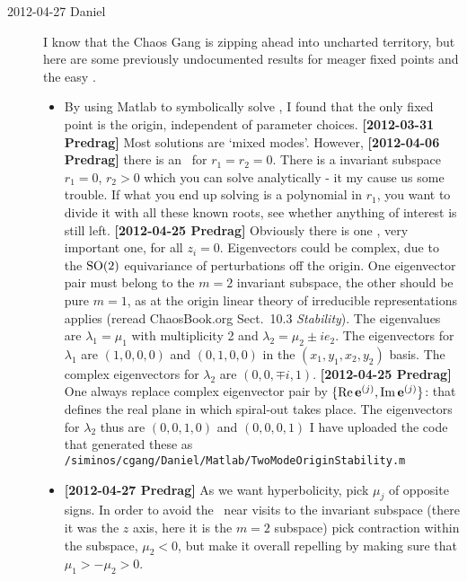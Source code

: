 \begin{description}
\item[2012-04-27 Daniel] I know that the Chaos Gang is zipping ahead into
uncharted territory, but here are some previously undocumented results
for meager fixed points and the easy \reqva.
	\begin{itemize}
		\item By using Matlab to symbolically solve  ,
             I found that the only fixed point is the origin, independent
             of parameter choices.
{\bf [2012-03-31 Predrag]} Most solutions are `mixed modes'. However,
{\bf [2012-04-06 Predrag]}
there is an \eqv\ for $r_1=r_2=0$. There is a invariant subspace $r_1=0$,
$r_2 > 0$ which you can solve analytically - it my cause us some trouble.
If what you end up solving is a polynomial in $r_1$, you want to divide
it with all these known roots, see whether anything of interest is still
left. {\bf [2012-04-25 Predrag]} Obviously there is one \eqv, very
important one, for all $z_i=0$. Eigenvectors could be complex,
due to the $\SOn{2}$ equivariance of perturbations off the origin.
One eigenvector pair must belong to the $m=2$ invariant subspace, the other
should be pure $m=1$, as at the origin linear theory
of irreducible representations applies (reread ChaosBook.org Sect.~10.3
\emph{Stability}).
             The eigenvalues are $\lambda_1 = \mu_1$ with multiplicity 2 and
             $\lambda_2 = \mu_2 \pm i e_2$. The eigenvectors for
             $\lambda_1$ are $(1,0,0,0)$ and $(0,1,0,0)$ in the
             $(x_1,y_1,x_2,y_2)$ basis. The complex eigenvectors for
             $\lambda_2$ are $(0,0,\mp i, 1)$. {\bf [2012-04-25 Predrag]}
             One always replace complex eigenvector pair by  $\{\Re
             \jEigvec[j], \Im \jEigvec[j]\}$: that defines the real plane
             in which spiral-out takes place.
             The eigenvectors for
             $\lambda_2$ thus are $(0,0,1,0)$ and $(0,0,0,1)$
             I have uploaded the code that generated these as
             \texttt{/siminos/cgang/Daniel/Matlab/TwoModeOriginStability.m}
		\item {\bf [2012-04-27 Predrag]} As we want hyperbolicity, pick $\mu_j$
             of opposite signs. In order to avoid the \cLe\ near visits to
             the invariant subspace (there it was the $z$ axis, here it is the
             $m=2$ subspace) pick contraction within the subspace, $\mu_2 < 0$, but
             make it overall repelling by making sure that $\mu_1 > -\mu_2 > 0$.

\end{itemize}
\end{description}
